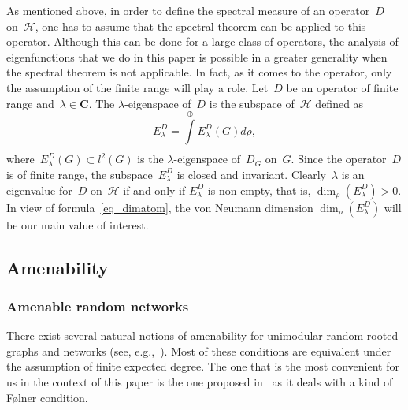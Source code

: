 \documentclass[english]{article}
\theoremstyle{definition}
\DeclareMathOperator{\Gr}{{\mathcal{G}_*}}
\newcommand*{\field}[1]{\mathbf{#1}} %
\newcommand*\C{\field{C}} %
\begin{document}
As mentioned above, in order to define the spectral measure of an operator~$D$ on~$\mathcal{H}$, one has to assume that the spectral theorem can be applied to this operator. Although this can be done for a large class of operators, the analysis of eigenfunctions that we do in this paper is possible in a greater generality when the spectral theorem is not applicable. In fact, as it comes to the operator, only the assumption of the finite range will play a role. 
Let~$D$ be an operator of finite range and~$\lambda \in \C$. The $\lambda$-eigenspace of~$D$ is the subspace of~$\mathcal{H}$ defined as
$$
E_\lambda^D = \int\limits^\oplus_{\Gr} E_\lambda^D(G)d \rho,
$$
where~$E^D_\lambda(G)\subset l^2(G)$ is the $\lambda$-eigenspace of~$D_G$ on~$G$. Since the operator~$D$ is of finite range, the subspace~$E_\lambda^D$ is closed and invariant. 
Clearly~$\lambda$ is an eigenvalue for~$D$ on~$\mathcal{H}$ if and only if $E_\lambda^D$ is non-empty, that is, $\dim_\rho(E_\lambda^D) > 0$. In view of formula~\eqref{eq_dimatom}, the von Neumann dimension $\dim_\rho(E_\lambda^D)$ will be our main value of interest. 

\subsection{Amenability}

\subsubsection{Amenable random networks}\label{subsection_amen}

There exist several natural notions of amenability for unimodular random rooted graphs and networks (see, e.g.,~\cite{AL07, Ka1997amenability}). Most of these conditions are equivalent under the assumption of finite expected degree. The one that is the most convenient for us in the context of this paper is the one proposed in~\cite{AL07} as it deals with a kind of F\o lner condition. 
\end{document}

